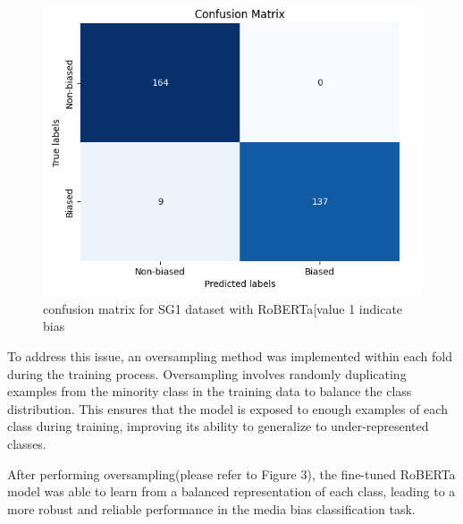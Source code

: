 \documentclass[11pt,a4paper]{article}
\begin{document}
\begin{figure}[h]
    \centering
    \includegraphics[width=0.9\linewidth]{cm_SG1_cl.png}
    \caption{confusion matrix for SG1 dataset with RoBERTa[value 1 indicate bias}
    \label{fig:enter-label}
\end{figure}

To address this issue, an oversampling method was implemented within each fold during the training process. Oversampling involves randomly duplicating examples from the minority class in the training data to balance the class distribution. This ensures that the model is exposed to enough examples of each class during training, improving its ability to generalize to under-represented classes.

After performing oversampling(please refer to Figure 3), the fine-tuned RoBERTa model was able to learn from a balanced representation of each class, leading to a more robust and reliable performance in the media bias classification task.
\end{document}
